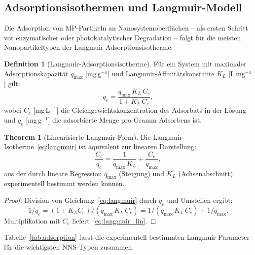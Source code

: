 ﻿\documentclass[12pt,a4paper]{article}
\theoremstyle{definition}
\newtheorem{definition}{Definition}[section]
\newtheorem{theorem}{Theorem}[section]
\theoremstyle{remark}
\begin{document}
\subsection{Adsorptionsisothermen und Langmuir-Modell}

Die Adsorption von MP-Partikeln an Nanosystemoberflächen -- als ersten Schritt
vor enzymatischer oder photokatalytischer Degradation -- folgt für die meisten
Nanopartikeltypen der Langmuir-Adsorptionsisotherme:

\begin{definition}[Langmuir-Adsorptionsisotherme]
\label{def:langmuir}
Für ein System mit maximaler Adsorptionskapazität $q_{\text{max}}$ [mg\,g$^{-1}$]
und Langmuir-Affinitätskonstante $K_L$ [L\,mg$^{-1}$] gilt:
\begin{equation}
  q_e = \frac{q_{\text{max}}\,K_L\,C_e}{1 + K_L\,C_e},
  \label{eq:langmuir}
\end{equation}
wobei $C_e$ [mg\,L$^{-1}$] die Gleichgewichtskonzentration des Adsorbats in
der Lösung und $q_e$ [mg\,g$^{-1}$] die adsorbierte Menge pro Gramm
Adsorbens ist.
\end{definition}

\begin{theorem}[Linearisierte Langmuir-Form]
\label{thm:langmuir_lin}
Die Langmuir-Isotherme~\eqref{eq:langmuir} ist äquivalent zur linearen Darstellung:
\begin{equation}
  \frac{C_e}{q_e} = \frac{1}{q_{\text{max}}\,K_L} + \frac{C_e}{q_{\text{max}}},
  \label{eq:langmuir_lin}
\end{equation}
aus der durch lineare Regression $q_{\text{max}}$ (Steigung) und
$K_L$ (Achsenabschnitt) experimentell bestimmt werden können.
\end{theorem}

\begin{proof}
Division von Gleichung~\eqref{eq:langmuir} durch $q_e$ und Umstellen ergibt:
\begin{equation}
  1/q_e = (1 + K_L C_e)/(q_{\text{max}}\,K_L\,C_e)
= 1/(q_{\text{max}}\,K_L\,C_e) + 1/q_{\text{max}}.
\end{equation}
Multiplikation mit $C_e$ liefert~\eqref{eq:langmuir_lin}.\hfill
\end{proof}

Tabelle~\ref{tab:adsorption} fasst die experimentell bestimmten
Langmuir-Parameter für die wichtigsten NNS-Typen zusammen.
\end{document}
